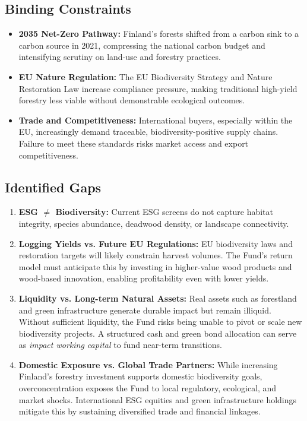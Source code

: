 \subsection*{Binding Constraints }
\begin{itemize}[leftmargin=*, itemsep=2pt]
    \item \textbf{2035 Net-Zero Pathway:} Finland’s forests shifted from a carbon sink to a carbon source in 2021, compressing the national carbon budget and intensifying scrutiny on land-use and forestry practices.
    \item \textbf{EU Nature Regulation:} The EU Biodiversity Strategy and Nature Restoration Law increase compliance pressure, making traditional high-yield forestry less viable without demonstrable ecological outcomes.
    \item \textbf{Trade and Competitiveness:} International buyers, especially within the EU, increasingly demand traceable, biodiversity-positive supply chains. Failure to meet these standards risks market access and export competitiveness.
\end{itemize}

\subsection*{Identified Gaps}
\begin{enumerate}[leftmargin=*, itemsep=2pt]
    \item \textbf{ESG $\neq$ Biodiversity:} Current ESG screens do not capture habitat integrity, species abundance, deadwood density, or landscape connectivity. 
    \item \textbf{Logging Yields vs. Future EU Regulations:} EU biodiversity laws and restoration targets will likely constrain harvest volumes. The Fund’s return model must anticipate this by investing in higher-value wood products and wood-based innovation, enabling profitability even with lower yields.
    \item \textbf{Liquidity vs. Long-term Natural Assets:} Real assets such as forestland and green infrastructure generate durable impact but remain illiquid. Without sufficient liquidity, the Fund risks being unable to pivot or scale new biodiversity projects. A structured cash and green bond allocation can serve as \emph{impact working capital} to fund near-term transitions.
    \item \textbf{Domestic Exposure vs. Global Trade Partners:} While increasing Finland’s forestry investment supports domestic biodiversity goals, overconcentration exposes the Fund to local regulatory, ecological, and market shocks. International ESG equities and green infrastructure holdings mitigate this by sustaining diversified trade and financial linkages.
\end{enumerate}

